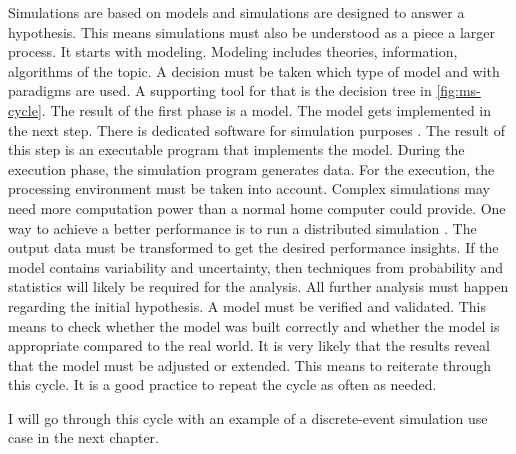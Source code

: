 Simulations are based on models and simulations are designed to answer a hypothesis. This means simulations must also be understood as a piece a larger process.
It starts with modeling. Modeling includes theories, information, algorithms of the topic. A decision must be taken which type of model and with paradigms are used. A supporting tool for that is the decision tree in \ref{fig:ms-cycle}.
The result of the first phase is a model. The model gets implemented in the next step. There is dedicated software for simulation purposes \cite{wiki:deslist}. The result of this step is an executable program that implements the model.
During the execution phase, the simulation program generates data. For the execution, the processing environment must be taken into account. Complex simulations may need more computation power than a normal home computer could provide. One way to achieve a better performance is to run a distributed simulation \cite{misra1986distributed}.
The output data must be transformed to get the desired performance insights.
If the model contains variability and uncertainty, then techniques from probability
and statistics will likely be required for the analysis. All further analysis must happen regarding the initial hypothesis. A model must be verified and validated. This means to check whether the model was built correctly and whether the model is appropriate compared to the real world.
 It is very likely that the results reveal that the model must be adjusted or extended. This means to reiterate through this cycle. It is a good practice to repeat the cycle as often as needed.

I will go through this cycle with an example of a discrete-event simulation use case in the next chapter.


